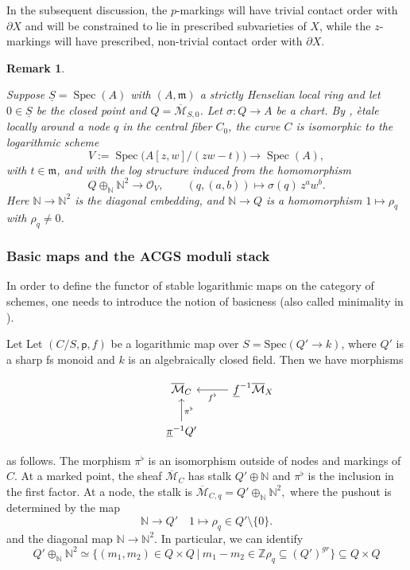 \documentclass{article}
\def\oM{\overline{\mathcal{M}}}
\def\Z{\mathbb{Z}}
\newtheorem{remark}[definition]{Remark}
\begin{document}
In the subsequent discussion, the $p$-markings will have trivial contact order with $\partial X$ and will be constrained to lie in prescribed subvarieties of $X$, while the $z$-markings will have prescribed, non-trivial contact order with $\partial X$.

\begin{remark}\label{rmk: local structure at node}
    
Suppose $\underline{S}=\operatorname{Spec}(A)$ with $(A,\mathfrak{m})$ a strictly Henselian local ring and let $0 \in \underline{S}$ be the closed point and $Q= \oM_{S,0}$. Let $\sigma: Q \to A$ be a chart. By \cite[Page 222]{Kato}, ètale locally around a node $q$ in the central fiber $C_0$, the curve $C$ is isomorphic to the logarithmic scheme
\[
V:=\operatorname{Spec}\big(A[z,w]/(zw - t)\big) \to \operatorname{Spec}(A),
\]
with $t \in \mathfrak{m}$, and with the log structure induced from the homomorphism
\[
Q \oplus_{\mathbb{N}} \mathbb{N}^2 \longrightarrow \mathcal{O}_V,
\qquad
(q,(a,b)) \longmapsto \sigma(q)\, z^a w^b.
\]
Here $\mathbb{N} \to \mathbb{N}^2$ is the diagonal embedding, and $\mathbb{N} \to Q$ is a homomorphism $1 \mapsto \rho_q$ with $\rho_q \neq 0$.

\end{remark}

\subsubsection{Basic maps and the ACGS moduli stack}

In order to define the functor of stable logarithmic maps on the category of schemes, one needs to introduce the notion of basicness (also called  minimality in \cite{GS2013}).


Let Let $(C/S,\mathsf{p},f)$ be a logarithmic map over $S = \mathrm{Spec}(Q' \to k)$, where $Q'$ is a sharp fs monoid and $k$ is an algebraically closed field. Then we have morphisms

\[
\begin{tikzcd} 
& \oM_C  & \underline{f}^{-1}\oM_X \arrow[l, "f^\flat "] \\ 
&\underline{\pi}^{-1} Q' \arrow[u, "\pi^\flat"']
\end{tikzcd} 
\]

as follows. The morphism $\pi^\flat$ is an isomorphism outside of nodes and markings of $C$. At a marked point, the sheaf $\oM_C$ has stalk $Q' \oplus \mathbb{N}$ and $\pi^\flat$ is the inclusion in the first factor. At a node, the stalk is
$
\oM_{C,q} = Q' \oplus_{\mathbb{N}} \mathbb{N}^2,
$
where the pushout is determined by the map
\begin{equation*}
\mathbb{N} \to Q' \quad  1 \mapsto \rho_q \in Q' \setminus \{0\}.
\end{equation*}
and the diagonal map $\mathbb{N} \to \mathbb{N}^2$. In particular, we can identify
\begin{equation}\label{eqn: structure at nodes}
    Q' \oplus_{\mathbb{N}} \mathbb{N}^2 \simeq \{(m_1,m_2) \in Q \times Q \ | \ m_1-m_2 \in \Z\rho_q \subseteq (Q')^{gr} \} \subseteq Q \times Q
\end{equation}
\end{document}
